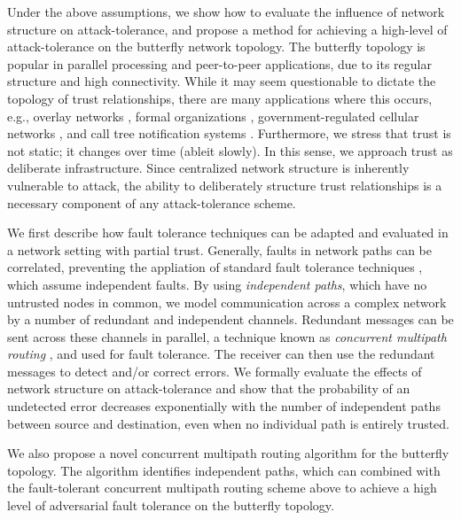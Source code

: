 \documentclass{sig-alternate-05-2015}
\begin{document}
Under the above assumptions,
we show how to evaluate the influence of network structure
on attack-tolerance,
and propose a method for achieving a high-level of attack-tolerance on
the butterfly network topology.
The butterfly topology is popular in parallel processing
\cite{kshemkalyani_distributed_2008} and
peer-to-peer \cite{lua_survey_2005, korzun_structured_2013}
applications, due to its regular structure and high connectivity.
While it may seem questionable to dictate the topology of trust relationships,
there are many applications where this occurs,
e.g., overlay networks
\cite{lua_survey_2005, korzun_structured_2013},
formal organizations \cite{mohr_explaining_1982},
government-regulated cellular networks \cite{walker_mass_2012},
and call tree notification systems \cite{nickerson_thinking_2010}.
Furthermore, we stress that trust is not static;
it changes over time (ableit slowly).
In this sense, we approach trust as deliberate infrastructure.
Since centralized network structure is inherently
vulnerable to attack, the ability to deliberately structure trust relationships
is a necessary component of any attack-tolerance scheme.

We first describe how fault tolerance techniques can be adapted and
evaluated in a network setting with partial trust.
Generally, faults in network paths can be correlated,
preventing the appliation of standard fault tolerance techniques
\cite{avizienis_basic_2004, von_neumann_probabilistic_1956},
which assume independent faults.
By using {\em independent paths},
which have no untrusted nodes in common,
we model communication across a complex network by a number of
redundant and independent channels.
Redundant messages can be sent across these channels in parallel,
a technique known as {\em concurrent multipath routing}
\cite{zin_survey_2015, qadir_exploiting_2015, khiani_comparative_2013},
and used for fault tolerance.
The receiver can then use the redundant messages to detect and/or correct
errors.
We formally evaluate the
effects of network structure on attack-tolerance and show that the probability
of an undetected error decreases exponentially with the number of
independent paths between source and destination,
even when no individual path is entirely trusted.

We also propose a novel concurrent multipath routing algorithm for the butterfly
topology.
The algorithm identifies independent paths,
which can combined with the fault-tolerant concurrent multipath routing
scheme above to
achieve a high level of adversarial fault tolerance on the butterfly topology.
\end{document}
